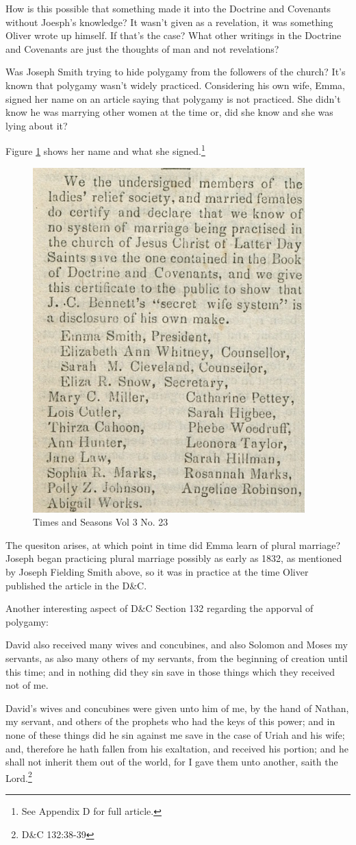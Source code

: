 How is this possible that something made it into the Doctrine and Covenants without
Joesph's knowledge? It wasn't given as a revelation, it was something Oliver wrote up
himself. If that's the case? What other writings in the Doctrine and Covenants are
just the thoughts of man and not revelations?

Was Joseph Smith trying to hide polygamy from the followers of the church? It's known
that polygamy wasn't widely practiced. Considering his own wife, Emma, signed her
name on an article saying that polygamy is not practiced. She didn't know he was
marrying other women at the time or, did she know and she was lying about it?

Figure \ref{fig:tas1} shows her name and what she signed.\footnote{See Appendix D for
full article.}

\begin{figure}[h!]
  \centering
  \includegraphics[width=0.4\linewidth]{articles/images/polygamy.png}
  \caption{Times and Seasons Vol 3 No. 23}
  \label{fig:tas1}
\end{figure}

The quesiton arises, at which point in time did Emma learn of plural marriage? 
Joseph began practicing plural marriage possibly as early as 1832, as mentioned by
Joseph Fielding Smith above, so it was in practice at the time Oliver published the
article in the D\&C.

Another interesting aspect of D\&C Section 132 regarding the apporval of polygamy:

\begin{displayquote}
David also received many wives and concubines, and also Solomon and Moses my 
servants, as also many others of my servants, from the beginning of creation until 
this time; and in nothing did they sin save in those things which they received 
not of me.

David’s wives and concubines were given unto him of me, by the hand of Nathan, 
my servant, and others of the prophets who had the keys of this power; and in none of 
these things did he sin against me save in the case of Uriah and his wife; and, 
therefore he hath fallen from his exaltation, and received his portion; and he 
shall not inherit them out of the world, for I gave them unto another, saith the 
Lord.\footnote{D\&C 132:38-39}
\end{displayquote}

